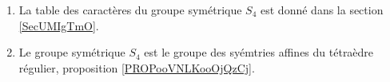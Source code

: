 
\begin{enumerate}
    \item
        La table des caractères du groupe symétrique \( S_4\) est donné dans la section \ref{SecUMIgTmO}.
    \item
        Le groupe symétrique \( S_4\) est le groupe des syémtries affines du tétraèdre régulier, proposition \ref{PROPooVNLKooOjQzCj}.
\end{enumerate}
